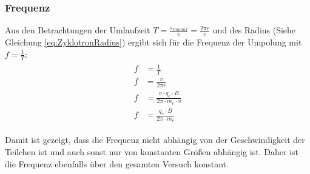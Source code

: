 \subsubsection{Frequenz}

Aus den Betrachtungen der Umlaufzeit $T = \frac{s_{Umlauf}}{v} = \frac{2 \pi r}{v}$ und des Radius (Siehe Gleichung \ref{eq:ZyklotronRadius}) ergibt sich für die Frequenz der Umpolung mit $f=\frac{1}{T}$: \\

\begin{align}
\begin{split}
	f &= \frac{1}{T} \\
	f &= \frac{v}{2 \pi r} \\
	f &= \frac{v \cdot q_e \cdot B}{2 \pi \cdot m_e \cdot v} \\
	f &= \frac{q_e \cdot B}{2 \pi \cdot m_e}
\end{split}
\end{align}

\noindent Damit ist gezeigt, dass die Frequenz nicht abhängig von der Geschwindigkeit der Teilchen ist und auch sonst nur von konstanten Größen abhängig ist. Daher ist die Frequenz ebenfalls über den gesamten Versuch konstant.




